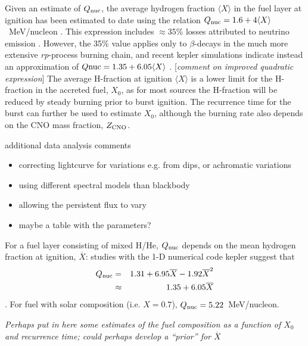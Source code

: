 \documentclass{aastex63}
\newcommand{\Xb}{\ensuremath{\overline{X}}}
\newcommand{\qnuc}{Q_{\rm nuc}}
\begin{document}
Given an estimate of $Q_{\rm nuc}$, the average hydrogen fraction $\langle X\rangle$ in the fuel layer at ignition has been estimated to date using the relation $Q_{\rm nuc}=1.6 + 4\langle X\rangle$~MeV/nucleon \cite[e.g.][and references therein]{gal03d}. This expression includes $\approx35$\% losses
attributed to neutrino emission \cite[]{fuji87}. However, the 35\% value applies only to $\beta$-decays in the much more extensive {\it rp}-process burning chain, and recent {\sc kepler} simulations indicate instead an approximation of 
$Q{\rm nuc}=1.35+6.05\langle X\rangle$ 
\cite[]{goodwin19a}.
[{\it comment on improved quadratic expression}]
%
The average H-fraction at ignition $\langle X\rangle$ is a lower limit for the H-fraction in the accreted fuel, $X_0$, as for most sources the H-fraction will be reduced by steady burning prior to burst ignition.
%
The recurrence time for the burst can further be used to estimate $X_0$, although the burning rate also depends on the CNO mass fraction, $Z_{\rm CNO}$.

additional data analysis comments
\begin{itemize}
\item correcting lightcurve for variations e.g. from dips, or achromatic variations
\item using different spectral models than blackbody
\item allowing the persistent flux to vary
\item maybe a table with the parameters?
\end{itemize}

For a fuel layer consisting of mixed H/He, $\qnuc$ depends on the mean hydrogen fraction at ignition, \Xb:
studies with the 1-D numerical code {\sc kepler} suggest that 
\begin{eqnarray}
Q_{\rm nuc} &= & 1.31+6.95\Xb-1.92\Xb^2 \nonumber \\
& \approx & 1.35 + 6.05 \Xb
\label{eq:qnuc}
\end{eqnarray}
\cite[]{goodwin19a}.
For fuel with solar composition (i.e. $X=0.7$), $Q_{\rm nuc}=5.22$~MeV/nucleon.

{\it Perhaps put in here some estimates of the fuel composition as a function of $X_0$ and recurrence time; could perhaps develop a ``prior'' for $\Xb$ }
\end{document}
